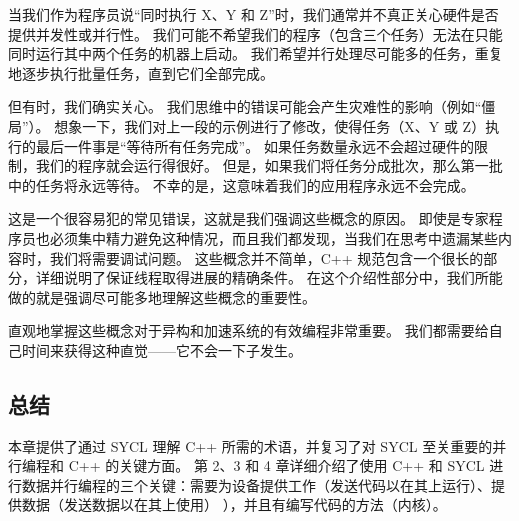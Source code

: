当我们作为程序员说“同时执行 X、Y 和 Z”时，我们通常并不真正关心硬件是否提供并发性或并行性。 我们可能不希望我们的程序（包含三个任务）无法在只能同时运行其中两个任务的机器上启动。 我们希望并行处理尽可能多的任务，重复地逐步执行批量任务，直到它们全部完成。

但有时，我们确实关心。 我们思维中的错误可能会产生灾难性的影响（例如“僵局”）。 想象一下，我们对上一段的示例进行了修改，使得任务（X、Y 或 Z）执行的最后一件事是“等待所有任务完成”。 如果任务数量永远不会超过硬件的限制，我们的程序就会运行得很好。 但是，如果我们将任务分成批次，那么第一批中的任务将永远等待。 不幸的是，这意味着我们的应用程序永远不会完成。

这是一个很容易犯的常见错误，这就是我们强调这些概念的原因。 即使是专家程序员也必须集中精力避免这种情况，而且我们都发现，当我们在思考中遗漏某些内容时，我们将需要调试问题。 这些概念并不简单，C++ 规范包含一个很长的部分，详细说明了保证线程取得进展的精确条件。 在这个介绍性部分中，我们所能做的就是强调尽可能多地理解这些概念的重要性。

直观地掌握这些概念对于异构和加速系统的有效编程非常重要。 我们都需要给自己时间来获得这种直觉——它不会一下子发生。

\subsection{总结}
本章提供了通过 SYCL 理解 C++ 所需的术语，并复习了对 SYCL 至关重要的并行编程和 C++ 的关键方面。 第 2、3 和 4 章详细介绍了使用 C++ 和 SYCL 进行数据并行编程的三个关键：需要为设备提供工作（发送代码以在其上运行）、提供数据（发送数据以在其上使用） ），并且有编写代码的方法（内核）。

